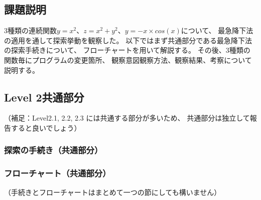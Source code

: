 \subsection{課題説明}
3種類の連続関数$y=x^2$、$z=x^2+y^2$、$y=-x \times cos(x)$について、
最急降下法の適用を通して探索挙動を観察した。
以下ではまず共通部分である最急降下法の探索手続きについて、
フローチャートを用いて解説する。
その後、3種類の関数毎にプログラムの変更箇所、
観察意図観察方法、観察結果、考察について説明する。


\subsection{Level 2共通部分}
（補足：Level2.1, 2.2, 2.3 には共通する部分が多いため、
共通部分は独立して報告すると良いでしょう）

\subsubsection{探索の手続き（共通部分）}

\subsubsection{フローチャート（共通部分）}
（手続きとフローチャートはまとめて一つの節にしても構いません）

